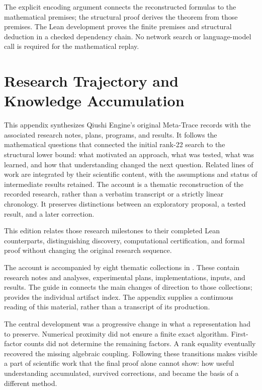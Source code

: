 \documentclass[11pt,a4paper]{article}
\begin{document}
The explicit encoding argument connects the reconstructed formulas to
the mathematical premises; the structural proof derives the theorem
from those premises. The Lean development proves the finite premises and
structural deduction in a checked dependency chain. No network search or language-model call is required
for the mathematical replay.

\FloatBarrier
\clearpage
\section{Research Trajectory and Knowledge Accumulation}\label{app:research-record}

This appendix synthesizes Qiushi Engine's original Meta-Trace records
with the associated research notes, plans, programs, and results. It
follows the mathematical questions that connected the
initial rank-22 search to the structural lower bound: what motivated an
approach, what was tested, what was learned, and how that understanding
changed the next question. Related lines of work are integrated by their
scientific content, with the assumptions and status of intermediate
results retained. The account is a thematic reconstruction of the recorded
research, rather than a verbatim transcript or a strictly linear chronology.
It preserves distinctions between an exploratory proposal, a tested result,
and a later correction.

This edition relates those research milestones to their completed Lean
counterparts, distinguishing discovery, computational certification, and
formal proof without changing the original research sequence.

The account is accompanied by eight thematic collections in
. These contain research notes and analyses,
experimental plans, implementations, inputs, and results. The guide in
 connects the main changes of direction to those
collections;  provides the individual
artifact index. The appendix supplies a continuous reading of this
material, rather than a transcript of its production.

The central development was a progressive change in what a representation
had to preserve. Numerical proximity did not ensure a finite exact
algorithm. First-factor counts did not determine the remaining factors.
A rank equality eventually recovered the missing algebraic coupling.
Following these transitions makes visible a part of scientific work that
the final proof alone cannot show: how useful understanding accumulated,
survived corrections, and became the basis of a different method.


\FloatBarrier

\FloatBarrier
\clearpage
{}
{}
\ifQiushiHasCitations
\fi
\end{document}
